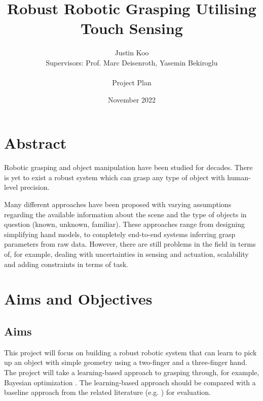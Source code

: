 \documentclass{article}
\title{Robust Robotic Grasping Utilising Touch Sensing}
\author{Justin Koo\\Supervisors: Prof. Marc Deisenroth, Yasemin Bekiroglu\\ \\Project Plan}
\date{November 2022}
\begin{document}
\maketitle

\section{Abstract}
Robotic grasping and object manipulation have been studied for decades. There is yet to exist a robust system which can grasp any type of object with human-level precision.

\noindent\newline
Many different approaches have been proposed with varying assumptions regarding the available information about the scene and the type of objects in question (known, unknown, familiar). These approaches range from designing simplifying hand models, to completely end-to-end systems inferring grasp parameters from raw data. However, there are still problems in the field in terms of, for example, dealing with uncertainties in sensing and actuation, scalability and adding constraints in terms of task.


\section{Aims and Objectives}
\subsection{Aims}
This project will focus on building a robust robotic system that can learn to pick up an object with simple geometry using a two-finger and a three-finger hand. The project will take a learning-based approach to grasping through, for example, Bayesian optimization \cite{nogueria, frazier}. The learning-based approach should be compared with a baseline approach from the related literature (e.g. \cite{nogueria, danielczuk, breyer}) for evaluation. 
\end{document}
